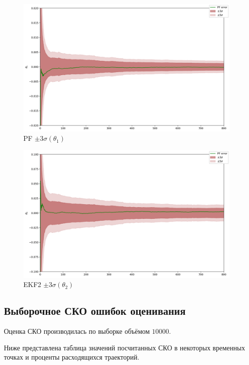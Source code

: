 \documentclass[a4paper,12pt]{article}
\begin{document}
\begin{landscape}
\begin{figure}[p]
\centering
\caption{PF $\pm 3\sigma(\theta_1)$}
\includegraphics[width=0.95\linewidth]{PF_err_theta1.png}
\end{figure}

\begin{figure}[p]
\centering
\caption{EKF2 $\pm 3\sigma(\theta_2)$}
\includegraphics[width=0.95\linewidth]{PF_err_theta2.png}
\end{figure}
\end{landscape}

\subsection{Выборочное СКО ошибок оценивания}

Оценка СКО производилась по выборке объёмом $10000$.

Ниже представлена таблица значений посчитанных СКО в некоторых временных точках и проценты расходящихся траекторий.
\end{document}

